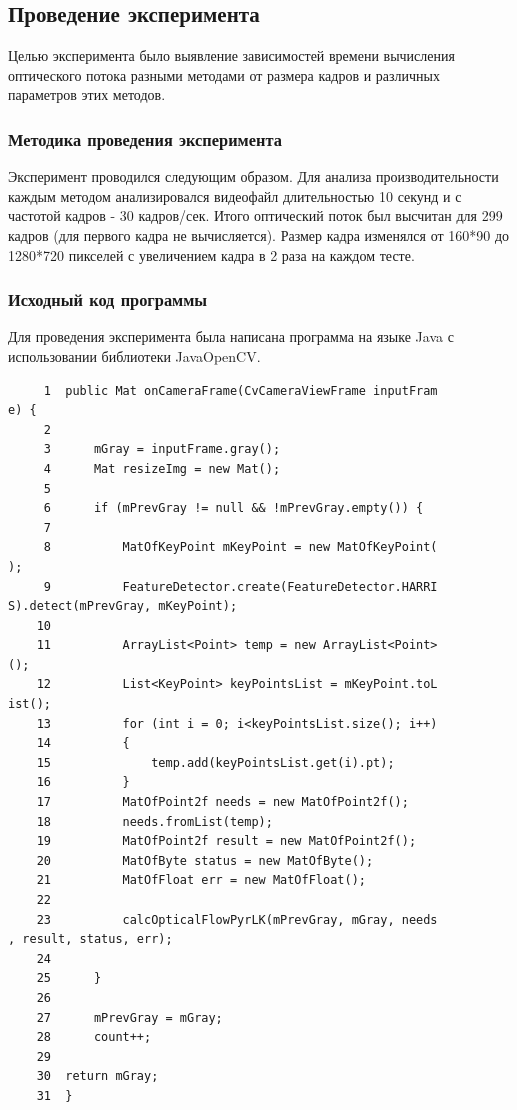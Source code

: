 \subsection{Проведение эксперимента}

Целью эксперимента было выявление зависимостей времени вычисления оптического потока разными методами от размера кадров и различных параметров этих методов.

\subsubsection{Методика проведения эксперимента}
Эксперимент проводился следующим образом.
Для анализа производительности каждым методом анализировался видеофайл длительностью 10 секунд и с частотой кадров - 30 кадров/сек. Итого оптический поток был высчитан для 299 кадров (для первого кадра не вычисляется). Размер кадра изменялся от 160*90 до 1280*720 пикселей с увеличением кадра в 2 раза на каждом тесте.

\subsubsection{Исходный код программы}
Для проведения эксперимента была написана программа на языке Java с использовании библиотеки JavaOpenCV. 

\begin{verbatim}
     1	public Mat onCameraFrame(CvCameraViewFrame inputFram
e) {
     2	   
     3	    mGray = inputFrame.gray();
     4	    Mat resizeImg = new Mat();
     5	
     6	    if (mPrevGray != null && !mPrevGray.empty()) {
     7	       
     8	        MatOfKeyPoint mKeyPoint = new MatOfKeyPoint(
);
     9	        FeatureDetector.create(FeatureDetector.HARRI
S).detect(mPrevGray, mKeyPoint);
    10	
    11	        ArrayList<Point> temp = new ArrayList<Point>
();
    12	        List<KeyPoint> keyPointsList = mKeyPoint.toL
ist();
    13	        for (int i = 0; i<keyPointsList.size(); i++)
    14	        {
    15	            temp.add(keyPointsList.get(i).pt);
    16	        }
    17	        MatOfPoint2f needs = new MatOfPoint2f();
    18	        needs.fromList(temp);
    19	        MatOfPoint2f result = new MatOfPoint2f();
    20	        MatOfByte status = new MatOfByte();
    21	        MatOfFloat err = new MatOfFloat();
    22	
    23	        calcOpticalFlowPyrLK(mPrevGray, mGray, needs
, result, status, err);
    24	
    25	    }
    26	
    27	    mPrevGray = mGray;
    28	    count++;
    29	
    30	return mGray;
    31	}

\end{verbatim}

